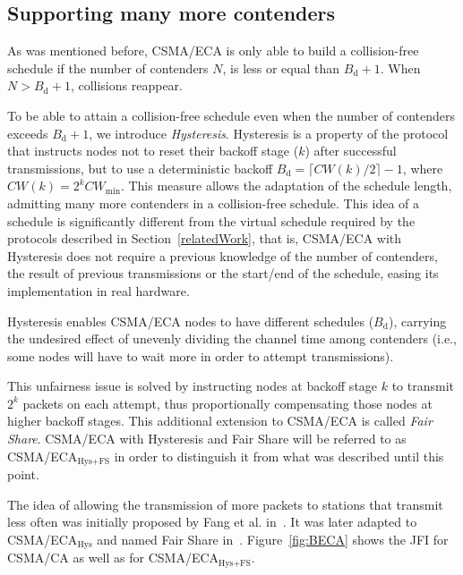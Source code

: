 	\subsection{Supporting many more contenders}\label{moreContenders}
	As was mentioned before, CSMA/ECA is only able to build a collision-free schedule if the number of contenders $N$, is less or equal than $B_{\text{d}}+1$. When $N > B_{\text{d}}+1$, collisions reappear. 
	
	To be able to attain a collision-free schedule even when the number of contenders exceeds $B_{\text{d}}+1$, we introduce \emph{Hysteresis}. Hysteresis is a property of the protocol that instructs nodes not to reset their backoff stage ($k$) after successful transmissions, but to use a deterministic backoff $B_{\text{d}}=\lceil CW(k)/2\rceil -1$, where $CW(k)=2^{k}CW_{\min}$. This measure allows the adaptation of the schedule length, admitting many more contenders in a collision-free schedule. This idea of a schedule is significantly different from the virtual schedule required by the protocols described in Section~\ref{relatedWork}, that is, CSMA/ECA with Hysteresis does not require a previous knowledge of the number of contenders, the result of previous transmissions or the start/end of the schedule, easing its implementation in real hardware.
	
	Hysteresis enables CSMA/ECA nodes to have different schedules ($B_{\text{d}}$), carrying the undesired effect of unevenly dividing the channel time among contenders (i.e., some nodes will have to wait more in order to attempt transmissions).
	
	This unfairness issue is solved by instructing nodes at backoff stage $k$ to transmit $2^{k}$ packets on each attempt, thus proportionally compensating those nodes at higher backoff stages. This additional extension to CSMA/ECA is called \emph{Fair Share}. CSMA/ECA with Hysteresis and Fair Share will be referred to as CSMA/ECA$_{\text{Hys+FS}}$ in order to distinguish it from what was described until this point.
	
	The idea of allowing the transmission of more packets to stations that transmit less often was initially proposed by Fang et al. in~\cite{L_MAC}. It was later adapted to CSMA/ECA$_{\text{Hys}}$ and named Fair Share in~\cite{research2standards}. Figure~\ref{fig:BECA} shows the JFI for CSMA/CA as well as for CSMA/ECA$_{\text{Hys+FS}}$.
	
	
